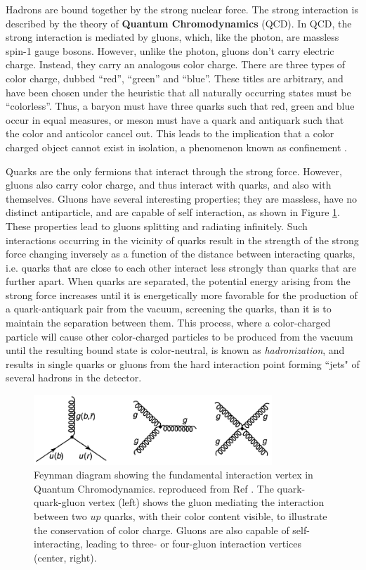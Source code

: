 \documentclass[12pt,a4paper,openright,twoside]{report}
\begin{document}
Hadrons are bound together by the strong nuclear force. The strong interaction is described by the theory of \textbf{Quantum Chromodynamics} (QCD). In QCD, the strong interaction is mediated by gluons, which, like the photon, are massless spin-1 gauge bosons. However, unlike the photon, gluons don't carry electric charge. Instead, they carry an analogous color charge. There are three types of color charge, dubbed ``red'', ``green'' and ``blue''. These titles are arbitrary, and have been chosen under the heuristic that all naturally occurring states must be ``colorless''. Thus, a baryon must have three quarks such that red, green and blue occur in equal measures, or meson must have a quark and antiquark such that the color and anticolor cancel out. This leads to the implication that a color charged object cannot exist in isolation, a phenomenon known as confinement \cite{confinement}.

Quarks are the only fermions that interact through the strong force. However, gluons also carry color charge, and thus interact with quarks, and also with themselves. Gluons have several interesting properties; they are massless, have no distinct antiparticle, and are capable of self interaction, as shown in Figure \ref{fig:qcd_fund_vertex}. These properties lead to gluons splitting and radiating infinitely. Such interactions occurring in the vicinity of quarks result in the strength of the strong force changing inversely as a function of the distance between interacting quarks, i.e. quarks that are close to each other interact less strongly than quarks that are further apart. When quarks are separated, the potential energy arising from the strong force increases until it is energetically more favorable for the production of a quark-antiquark pair from the vacuum, screening the quarks, than it is to maintain the separation between them. This process, where a color-charged particle will cause other color-charged particles to be produced from the vacuum until the resulting bound state is color-neutral, is known as \textit{hadronization}, and results in single quarks or gluons from the hard interaction point forming ``jets" of several hadrons in the detector.

\begin{figure}[h]
\centering
\includegraphics[width = 0.8\textwidth]{fundamental_vertex_qcd.png}
\caption{Feynman diagram showing the fundamental interaction vertex in Quantum Chromodynamics. reproduced from Ref \cite{griff}. The quark-quark-gluon vertex (left) shows the gluon mediating the interaction between two $up$ quarks, with their color content visible, to illustrate the conservation of color charge. Gluons are also capable of self-interacting, leading to three- or four-gluon interaction vertices (center, right).}
\label{fig:qcd_fund_vertex}
\end{figure}
\end{document}
